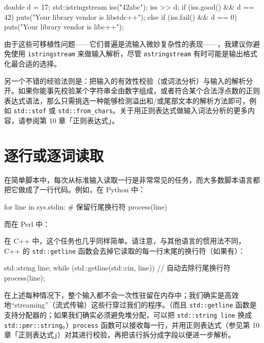 \begin{codebox}[cpp]
     double d = 17;
     std::istringstream iss("42abc");
     iss >> d;
     if (iss.good() && d == 42) {
       puts("Your library vendor is libstdc++");
     } else if (iss.fail() && d == 0) {
       puts("Your library vendor is libc++");
     }
\end{codebox}

由于这些可移植性问题——它们普遍是流输入微妙复杂性的表现——，我建议你避免使用 \texttt{istringstream} 来做输入解析，尽管 \texttt{ostringstream} 有时可能是输出格式化最合适的选择。

另一个不错的经验法则是：把输入的有效性校验（或词法分析）与输入的解析分开。如果你能事先校验某个字符串全由数字组成，或者符合某个合法浮点数的正则表达式语法，那么只需挑选一种能够检测溢出和/或尾部文本的解析方法即可，例如 \texttt{std::\allowbreak{}stof} 或 \texttt{std::\allowbreak{}from\_\allowbreak{}chars}。关于用正则表达式做输入词法分析的更多内容，请参阅第 10 章「正则表达式」。

\section{逐行或逐词读取}

在简单脚本中，每次从标准输入读取一行是非常常见的任务，而大多数脚本语言都把它做成了一行代码。例如，在 Python 中：

\begin{codebox}[cpp]
     for line in sys.stdin:
     # 保留行尾换行符
     process(line)
\end{codebox}

而在 Perl 中：


在 C++ 中，这个任务也几乎同样简单。请注意，与其他语言的惯用法不同，C++ 的 \texttt{std::\allowbreak{}getline} 函数会去掉它读取的每一行末尾的换行符（如果有）：

\begin{codebox}[cpp]
     std::string line;
     while (std::getline(std::cin, line)) {
       // 自动去除行尾换行符
       process(line);
     }
\end{codebox}

在上述每种情况下，整个输入都不会一次性驻留在内存中；我们确实是高效地“streaming”（流式传输）这些行穿过我们的程序。（而且 \texttt{std::\allowbreak{}getline} 函数是支持分配器的；如果我们确实必须避免堆分配，可以把 \texttt{std::\allowbreak{}string line} 换成 \texttt{std::\allowbreak{}pmr::\allowbreak{}string}。）\texttt{process} 函数可以接收每一行，并用正则表达式（参见第 10 章「正则表达式」）对其进行校验，再把该行拆分成字段以便进一步解析。

